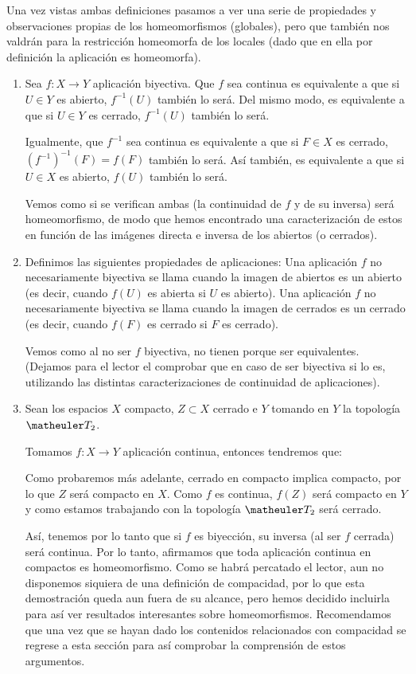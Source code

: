 Una vez vistas ambas definiciones pasamos a ver una serie de propiedades y observaciones propias de los homeomorfismos (globales), pero que también nos valdrán para la restricción homeomorfa de los locales (dado que en ella por definición la aplicación es homeomorfa).
\label{etop_obs_homeomorfismo}
\begin{obs}
	\begin{enumerate}
		\item 
		Sea $f:X\rightarrow Y$ aplicación biyectiva.
		Que $f$ sea continua es equivalente a que si $U\in Y$ es abierto, $f^{-1}(U)$ también lo será. Del mismo modo, es equivalente a que si $U\in Y$ es cerrado, $f^{-1}(U)$ también lo será.
		
		Igualmente, que $f^{-1}$ sea continua es equivalente a que si $F\in X$ es cerrado, $(f^{-1})^{-1}(F)=f(F)$ también lo será. Así también, es equivalente a que si $U\in X$ es abierto, $f(U)$ también lo será.
		
		Vemos como si se verifican ambas (la continuidad de $f$ y de su inversa) será homeomorfismo, de modo que hemos encontrado una caracterización de estos en función de las imágenes directa e inversa de los abiertos (o cerrados).
		
		\item
		Definimos las siguientes propiedades de aplicaciones:
		Una aplicación $f$ no necesariamente biyectiva se llama  cuando la imagen de abiertos es un abierto (es decir, cuando $f(U)$ es abierta si $U$ es abierto).
		Una aplicación $f$ no necesariamente biyectiva se llama  cuando la imagen de cerrados es un cerrado (es decir, cuando $f(F)$ es cerrado si $F$ es cerrado).
		
		Vemos como al no ser $f$ biyectiva, no tienen porque ser equivalentes. (Dejamos para el lector el comprobar que en caso de ser biyectiva si lo es, utilizando las distintas caracterizaciones de continuidad de aplicaciones).
		
		\item
		Sean los espacios $X$ compacto, $Z\subset X$ cerrado e $Y$ tomando en $Y$ la topología $\T_2$.
	
		 Tomamos $f: X\rightarrow Y$ aplicación continua, entonces tendremos que:
		
		Como probaremos más adelante, cerrado en compacto implica compacto, por lo que $Z$ será compacto en $X$.
		Como $f$ es continua, $f(Z)$ será compacto en $Y$ y como estamos trabajando con la topología $\T_2$ será cerrado.
		
		Así, tenemos por lo tanto que si $f$ es biyección, su inversa (al ser $f$ cerrada) será continua. Por lo tanto, afirmamos que toda aplicación continua en compactos es homeomorfismo.
		Como se habrá percatado el lector, aun no disponemos siquiera de una definición de compacidad, por lo que esta demostración queda aun fuera de su alcance, pero hemos decidido incluirla para así ver resultados interesantes sobre homeomorfismos. Recomendamos que una vez que se hayan dado los contenidos relacionados con compacidad se regrese a esta sección para así comprobar la comprensión de estos argumentos.
	\end{enumerate}
\end{obs}
